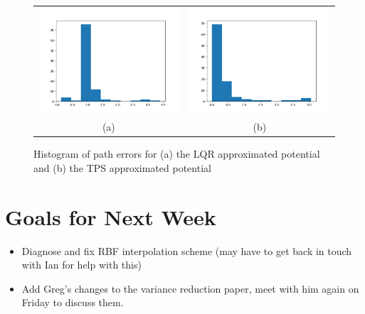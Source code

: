 \documentclass[12pt,a4paper]{article}
\begin{document}
\begin{figure}
\centering
\begin{tabular}{cc}
\includegraphics[scale=.5]{./Figs/lqr_ham_hist.png} & \includegraphics[scale=.5]{./Figs/tps_ham_hist.png}\\
(a) & (b)\\
\end{tabular}
\caption{Histogram of path errors for (a) the LQR approximated potential and (b) the TPS approximated potential}
\end{figure}

\section{Goals for Next Week}
\begin{itemize}
\item Diagnose and fix RBF interpolation scheme (may have to get back in touch with Ian for help with this)
\item Add Greg's changes to the variance reduction paper, meet with him again on Friday to discuss them.
\end{itemize}
\end{document}
